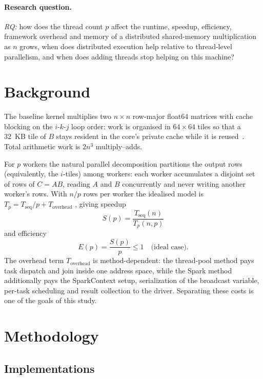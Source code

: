 \documentclass[11pt,a4paper]{article}
\begin{document}
\paragraph{Research question.}
\emph{RQ:} how does the thread count $p$ affect the runtime, speedup,
efficiency, framework overhead and memory of a distributed shared-memory
multiplication as $n$ grows, when does distributed execution help relative
to thread-level parallelism, and when does adding threads stop helping on
this machine?

\section{Background}
\label{sec:background}

The baseline kernel multiplies two $n \times n$ row-major float64 matrices
with cache blocking on the $i$-$k$-$j$ loop order: work is organised in
$64 \times 64$ tiles so that a 32~KB tile of $B$ stays resident in the
core's private cache while it is reused~\cite{lam1991,hennessy2017}. Total
arithmetic work is $2n^3$ multiply--adds.

For $p$ workers the natural parallel decomposition partitions the output
rows (equivalently, the $i$-tiles) among workers: each worker accumulates a
disjoint set of rows of $C = AB$, reading $A$ and $B$ concurrently and never
writing another worker's rows. With $n/p$ rows per worker the idealised
model is $T_p = T_{\mathrm{seq}}/p + T_{\mathrm{overhead}}$
\cite{amdahl1967,hill2008}, giving speedup
\begin{equation}
S(p) = \frac{T_{\mathrm{seq}}(n)}{T_p(n, p)}
\end{equation}
and efficiency
\begin{equation}
E(p) = \frac{S(p)}{p} \le 1 \quad \text{(ideal case)}.
\end{equation}
The overhead term $T_{\mathrm{overhead}}$ is method-dependent: the
thread-pool method pays task dispatch and join inside one address space,
while the Spark method additionally pays the SparkContext setup,
serialization of the broadcast variable, per-task scheduling and result
collection to the driver. Separating these costs is one of the goals of
this study.

\section{Methodology}
\label{sec:methodology}

\subsection{Implementations}
\end{document}
